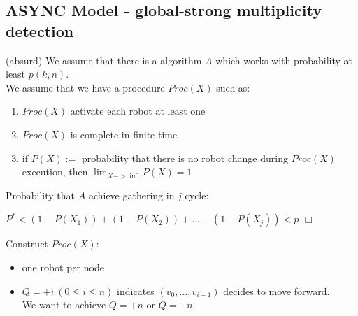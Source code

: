 \documentclass{beamer}
\begin{document}
\subsection{ASYNC Model - global-strong multiplicity detection}
\begin{frame}
	(absurd) We assume that there is a algorithm $A$ which works with probability at least $p(k, n)$.  \\
	\pause
	We assume that we have a procedure $Proc(X)$ such as:
	\begin{enumerate}
		\item $Proc(X)$ activate each robot at least one
		\pause
		\item $Proc(X)$ is complete in finite time
		\pause
		\item if $P(X):=$ probability that there is no robot change during $Proc(X)$ execution,
		then $\lim_{X->\inf}{P(X)} = 1$ 
	\end{enumerate}
	\pause
	Probability that $A$ achieve gathering in $j$ cycle:
	\begin{center}
		\begin{math}
			P^* < (1-P(X_1)) + (1-P(X_2)) + ... + (1-P(X_j)) < p
		\end{math}
		$\Box$
	\end{center}
\end{frame}
\begin{frame}
	Construct $Proc(X)$:
	\begin{itemize}
		\pause
		\item one robot per node
		\pause
		\item 	$Q = +i\ (0 \leq i \leq n)$ indicates $(v_0, ..., v_{i-1})$ decides to move forward. \\
		\pause We want to achieve $Q = +n$ or $Q = -n$.
	\end{itemize}
\end{frame}
\end{document}
